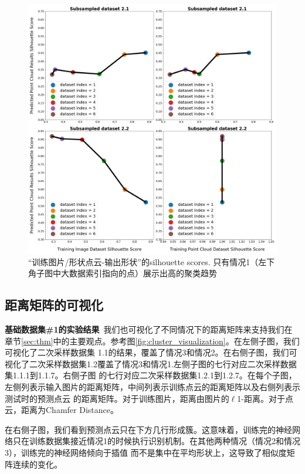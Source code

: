 \documentclass[bachelor, nocolorlinks, printoneside]{seuthesis} %
\begin{document}
\begin{Main}
\begin{figure}[h!]
    \centering
    \includegraphics[width=.95\textwidth]{figs/silhouette-dataset-2.png}
    \caption{\small “训练图片/形状点云-输出形状”的silhouette scores. 只有情况1（左下角子图中大数据索引指向的点）展示出高的聚类趋势}
    \label{fig:silhouette-dataset-2.png}
\end{figure}

\subsection{距离矩阵的可视化}

\textbf{基础数据集\#1的实验结果}~我们也可视化了不同情况下的距离矩阵来支持我们在章节\ref{sec:thm}中的主要观点。参考图\ref{fig:cluster_visualization}。在左侧子图，我们可视化了二次采样数据集
1.1的结果，覆盖了情况3和情况2。在右侧子图，我们可视化了二次采样数据集1.2覆盖了情况3和情况1.左侧子图的七行对应二次采样数据集1.1.1到1.1.7。右侧子图
的七行对应二次采样数据集1.2.1到1.2.7。在每个子图，左侧列表示输入图片的距离矩阵，中间列表示训练点云的距离矩阵以及右侧列表示测试时的预测点云
的距离矩阵。对于训练图片，距离由图片的$\ell$1-距离。对于点云，距离为Chamfer Distance。

在右侧子图，我们看到预测点云只在下方几行形成簇。这意味着，训练完的神经网络只在训练数据集接近情况1的时候执行识别机制。在其他两种情况（情况2和情况3），训练完的神经网络倾向于插值
而不是集中在平均形状上，这导致了相似度矩阵连续的变化。



\end{Main}
\end{document}
